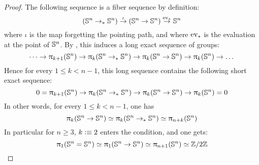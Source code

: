 \documentclass[english,a4]{article}
\newcommand{\ptdto}{\to_\ast}%
\begin{document}
\begin{proof}%
  The following sequence is a fiber sequence by definition:
  \begin{displaymath}
    (\Sn n \ptdto \Sn n) \stackrel \iota \to (\Sn n \to \Sn n) \stackrel {\ev_\ast}\to \Sn n
  \end{displaymath}
  where $\iota$ is the map forgetting the pointing path, and where $\mathrm{ev}_\ast$
  is the evaluation at the point of ${\mathbb S^{n}}$. By \cite[Theorem 8.4.6]{HoTT}, this
  induces a long exact sequence of groups:
  \begin{displaymath}
    \dots \to \hgr{k+1} (\Sn n) 
    \to \hgr k(\Sn n \ptdto \Sn n) \to \hgr k(\Sn n \to \Sn n) \to \hgr k(\Sn n) 
    \to \dots
  \end{displaymath}
  Hence for every $1\leq k < n-1$, this long sequence contains the following short exact sequence:
  \begin{displaymath}
    0 = \hgr {k+1}(\Sn n) 
    \to \hgr k(\Sn n \ptdto \Sn n) \to \hgr k(\Sn n \to \Sn n) 
    \to \hgr k(\Sn n) = 0
  \end{displaymath}
  In other words, for every $1\leq k < n-1$, one has 
  \begin{displaymath}
    \hgr k(\Sn n\to \Sn n) \weq \hgr k(\Sn n\ptdto\Sn n) \weq \hgr {n+k}(\Sn n)
  \end{displaymath}
  In particular for $n\geq 3$, $k\vcentcolon\equiv 2$ enters the condition, and one gets:
  \begin{displaymath}
    \uppi_{1} ({\mathbb S^{n}} = {\mathbb S^{n}}) \simeq \uppi_{1} ({\mathbb S^{n}} \to {\mathbb S^{n}}) \simeq \uppi_{n+1} ({\mathbb S^{n}}) \simeq \mathbb{Z} \slash 2\mathbb{Z}
  \end{displaymath}
\end{proof}
\end{document}
